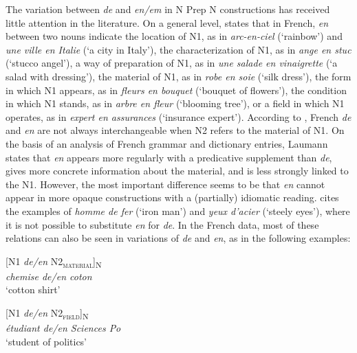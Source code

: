 \documentclass[output=paper]{langsci/langscibook}
\begin{document}
The variation between \textit{de} and \textit{en/em} in N Prep N constructions has received little attention in the literature. On a general level, \citet[411]{Lang:1991} states that in French, \textit{en} between two nouns indicate the location of N1, as in \textit{arc-en-ciel} (`rainbow') and \textit{une ville en Italie} (`a city in Italy'), the characterization of N1, as in \textit{ange en stuc} (`stucco angel'), a way of preparation of N1, as in \textit{une salade en vinaigrette} (`a salad with dressing'), the material of N1, as in \textit{robe en soie} (`silk dress'), the form in which N1 appears, as in \textit{fleurs en bouquet} (`bouquet of flowers'), the condition in which N1 stands, as in \textit{arbre en fleur} (`blooming tree'), or a field in which N1 operates, as in \textit{expert en assurances} (`insurance expert'). According to \citet[55]{Laumann:1998}, French \textit{de} and \textit{en} are not always interchangeable when N2 refers to the material of N1. On the basis of an analysis of French grammar and dictionary entries, Laumann states that \textit{en} appears more regularly with a predicative supplement than \textit{de}, gives more concrete information about the material, and is less strongly linked to the N1. However, the most important difference seems to be that \textit{en} cannot appear in more opaque constructions with a (partially) idiomatic reading. \citet[55]{Laumann:1998} cites the examples of \textit{homme de fer} (`iron man') and \textit{yeux d’acier} (`steely eyes'), where it is not possible to substitute \textit{en} for \textit{de}. In the French data, most of these relations can also be seen in variations of \textit{de} and \textit{en}, as in the following examples:

\begin{exe}\ex\begin{minipage}[t]{0.4\textwidth}
[N1 \textit{de/en} N2\textsubscript{\scshape material}]\textsubscript{N}\\
\textit{chemise de/en coton}\\
`cotton shirt'
\end{minipage}\hfill
\begin{minipage}[t]{0.45\textwidth}
[N1 \textit{de/en} N2\textsubscript{\scshape field}]\textsubscript{N}\\
\textit{étudiant de/en Sciences Po}\\
`student of politics'
\end{minipage}
\end{exe}
\end{document}
